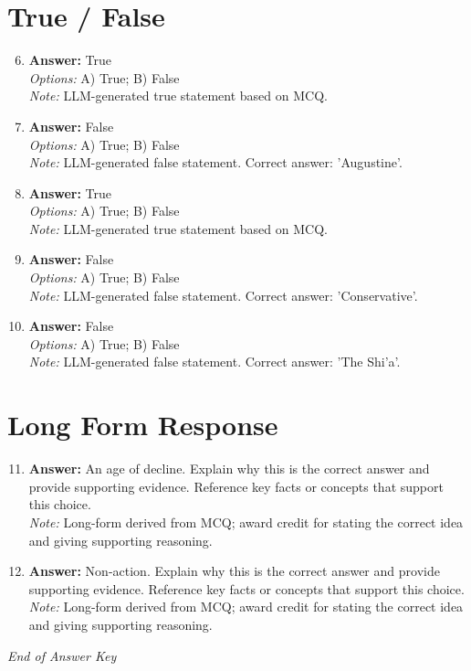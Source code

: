 \documentclass[12pt]{article}
\begin{document}
\section*{True / False}
\begin{enumerate}[label=\arabic*.]
\setcounter{enumi}{5}
\item \textbf{Answer:} True
\\ \textit{Options:} A) True; B) False
\\ \textit{Note:} LLM-generated true statement based on MCQ.
\item \textbf{Answer:} False
\\ \textit{Options:} A) True; B) False
\\ \textit{Note:} LLM-generated false statement. Correct answer: 'Augustine'.
\item \textbf{Answer:} True
\\ \textit{Options:} A) True; B) False
\\ \textit{Note:} LLM-generated true statement based on MCQ.
\item \textbf{Answer:} False
\\ \textit{Options:} A) True; B) False
\\ \textit{Note:} LLM-generated false statement. Correct answer: 'Conservative'.
\item \textbf{Answer:} False
\\ \textit{Options:} A) True; B) False
\\ \textit{Note:} LLM-generated false statement. Correct answer: 'The Shi'a'.
\end{enumerate}

\section*{Long Form Response}
\begin{enumerate}[label=\arabic*.]
\setcounter{enumi}{10}
\item \textbf{Answer:} An age of decline. Explain why this is the correct answer and provide supporting evidence. Reference key facts or concepts that support this choice.
\\ \textit{Note:} Long-form derived from MCQ; award credit for stating the correct idea and giving supporting reasoning.
\item \textbf{Answer:} Non-action. Explain why this is the correct answer and provide supporting evidence. Reference key facts or concepts that support this choice.
\\ \textit{Note:} Long-form derived from MCQ; award credit for stating the correct idea and giving supporting reasoning.
\end{enumerate}

\vfill
\noindent\textit{End of Answer Key}
\end{document}
